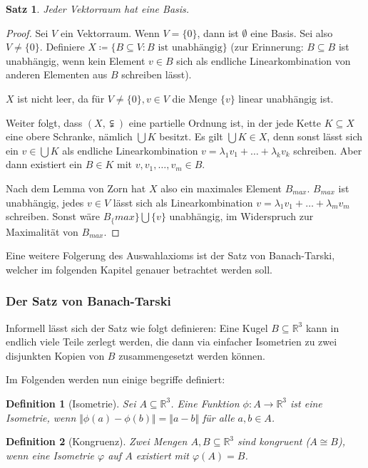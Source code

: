 \documentclass[german]{article}
\theoremstyle{break}
\theoremstyle{def_style}
\newtheorem{definition}{Definition}[section]
\theoremstyle{def_style}
\newtheorem{satz}{Satz}[section]
\theoremstyle{lemma_style}
\begin{document}
\begin{satz}
	Jeder Vektorraum hat eine Basis.
\end{satz}
\begin{proof}
	Sei $V$ ein Vektorraum. Wenn $V=\{0\}$, dann ist $\emptyset$ eine Basis. Sei also $V\neq\{0\}$. Definiere $X\coloneqq\{B\subseteq V : B\text{ ist unabhängig}\}$ (zur Erinnerung: $B\subseteq B$ ist unabhängig, wenn kein Element $v\in B$ sich als endliche Linearkombination von anderen Elementen aus $B$ schreiben lässt).
	
	$X$ ist nicht leer, da für $V\neq\{0\}, v\in V$ die Menge $\{v\}$ linear unabhängig ist.
	
	Weiter folgt, dass $(X,\subsetneqq)$ eine partielle Ordnung ist, in der jede Kette $K\subseteq X$ eine obere Schranke, nämlich $\bigcup K$ besitzt. Es gilt $\bigcup K\in X$, denn sonst lässt sich ein $v\in\bigcup K$ als endliche Linearkombination $v=\lambda_1v_1+\dots+\lambda_kv_k$ schreiben. Aber dann existiert ein $B\in K$ mit $v,v_1,\dots,v_m\in B$.
	
	Nach dem Lemma von Zorn hat $X$ also ein maximales Element $B_{max}$. $B_{max}$ ist unabhängig, jedes $v\in V$ lässt sich als Linearkombination $v=\lambda_1v_1+\dots+\lambda_mv_m$ schreiben. Sonst wäre $B_\{max\}\bigcup \{v\}$ unabhängig, im Widerspruch zur Maximalität von $B_{max}$.
\end{proof}

Eine weitere Folgerung des Auswahlaxioms ist der Satz von Banach-Tarski, welcher im folgenden Kapitel genauer betrachtet werden soll.

\subsubsection{Der Satz von Banach-Tarski}

Informell lässt sich der Satz wie folgt definieren: \glqq Eine Kugel $B\subseteq\mathbb{R}^3$ kann in endlich viele Teile zerlegt werden, die dann via einfacher Isometrien zu zwei disjunkten Kopien von $B$ zusammengesetzt werden können.\grqq{}

Im Folgenden werden nun einige begriffe definiert:

\begin{definition}[Isometrie]
	Sei $A\subseteq\mathbb{R}^3$. Eine Funktion $\phi:A\to\mathbb{R}^3$ ist eine \textit{Isometrie}, wenn $\Vert\phi(a)-\phi(b)\Vert=\Vert a-b\Vert$ für alle $a,b\in A$.
\end{definition}

\begin{definition}[Kongruenz]
	Zwei Mengen $A,B\subseteq\mathbb{R}^3$ sind \textit{kongruent} ($A\cong B$), wenn eine Isometrie $\varphi$ auf $A$ existiert mit $\varphi(A)=B$.
\end{definition}
\end{document}
